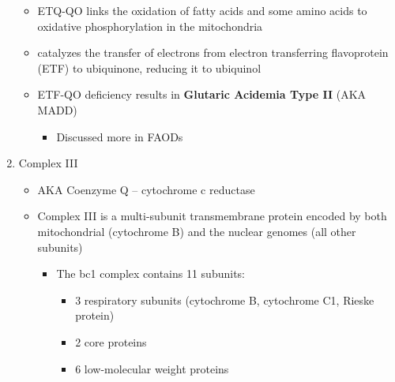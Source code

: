 \documentclass{scrartcl}
\begin{document}
\begin{enumerate}
\begin{itemize}
\item ETQ-QO links the oxidation of fatty acids and some amino acids to
oxidative phosphorylation in the mitochondria
\item catalyzes the transfer of electrons from electron transferring
flavoprotein (ETF) to ubiquinone, reducing it to ubiquinol
\end{itemize}

{\small{}}

\begin{itemize}
\item ETF-QO deficiency results in \textbf{Glutaric Acidemia Type II} (AKA MADD)
\begin{itemize}
\item Discussed more in FAODs
\end{itemize}
\end{itemize}
\item Complex III
\label{sec:orga377a49}
\begin{itemize}
\item AKA Coenzyme Q – cytochrome c reductase
\item Complex III is a multi-subunit transmembrane protein encoded by both
mitochondrial (cytochrome B) and the nuclear genomes (all other
subunits)

\begin{itemize}
\item The bc1 complex contains 11 subunits:
\begin{itemize}
\item 3 respiratory subunits (cytochrome B, cytochrome C1, Rieske protein)
\item 2 core proteins
\item 6 low-molecular weight proteins
\end{itemize}
\end{itemize}

{\small{}}
\end{itemize}


\end{enumerate}
\end{document}
